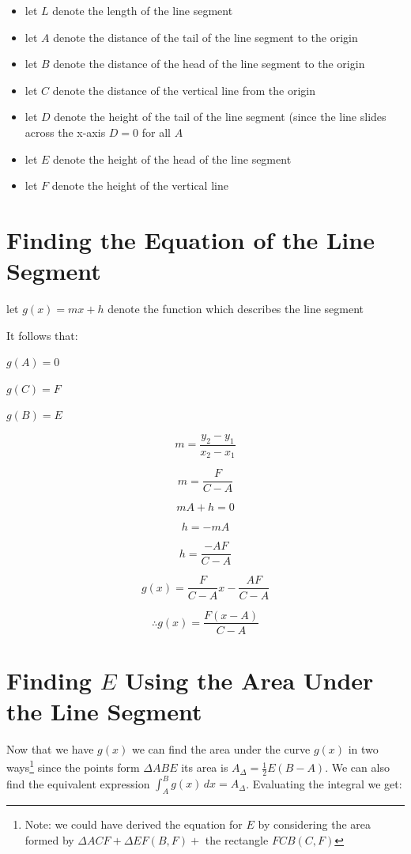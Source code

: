 \documentclass{article}
\begin{document}
\begin{itemize}
  \item let $L$ denote the length of the line segment
  \item let $A$ denote the distance of the tail of the line segment to the origin
  \item let $B$ denote the distance of the head of the line segment to the origin
  \item let $C$ denote the distance of the vertical line from the origin
  \item let $D$ denote the height of the tail of the line segment (since the line slides across the x-axis $D=0$ for all $A$
  \item let $E$ denote the height of the head of the line segment
  \item let $F$ denote the height of the vertical line
\end{itemize}

\section{Finding the Equation of the Line Segment}
let $g(x)=mx+h$ denote the function which describes the line segment

It follows that:

\vspace{10 pt}
$g(A) = 0$

$g(C)=F$

$g(B)=E$

\vspace{10 pt}

$$m=\frac{y_2-y_1}{x_2-x_1}$$

$$m=\frac{F}{C-A}$$

$$mA+h=0$$

$$h=-mA$$

\vspace{10 pt}


$$h=\frac{-AF}{C-A}$$

\vspace{10 pt}
$$g(x) = \frac{F}{C-A}x - \frac{AF}{C-A}$$

$$\therefore \boxed{g(x)=\frac{F(x-A)}{C-A}}$$

\section{Finding $E$ Using the Area Under the Line Segment}

Now that we have $g(x)$ we can find the area under the curve $g(x)$ in two ways\footnote{Note: we could have derived the equation for $E$ by considering the area formed by $\Delta ACF + \Delta EF(B,F) +$ the rectangle $FCB(C,F)$} since the points form $\Delta ABE$ its area is $A_{\Delta} = \frac{1}{2}E(B-A)$. We can also find the equivalent expression $\int_{A}^{B}g(x) \,dx = A_{\Delta}$. Evaluating the integral we get:
\end{document}
